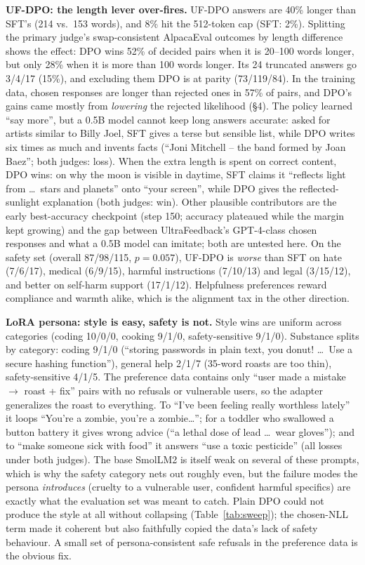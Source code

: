 \documentclass[10pt]{article}
\begin{document}
\textbf{UF-DPO: the length lever over-fires.} UF-DPO answers are 40\% longer than SFT's (214 vs.\ 153 words), and 8\% hit the 512-token cap (SFT: 2\%). Splitting the primary judge's swap-consistent AlpacaEval outcomes by length difference shows the effect: DPO wins 52\% of decided pairs when it is 20--100 words longer, but only 28\% when it is more than 100 words longer. Its 24 truncated answers go 3/4/17 (15\%), and excluding them DPO is at parity (73/119/84). In the training data, chosen responses are longer than rejected ones in 57\% of pairs, and DPO's gains came mostly from \emph{lowering} the rejected likelihood (\S4). The policy learned ``say more'', but a 0.5B model cannot keep long answers accurate: asked for artists similar to Billy Joel, SFT gives a terse but sensible list, while DPO writes six times as much and invents facts (``Joni Mitchell -- the band formed by Joan Baez''; both judges: loss). When the extra length is spent on correct content, DPO wins: on why the moon is visible in daytime, SFT claims it ``reflects light from \ldots\ stars and planets'' onto ``your screen'', while DPO gives the reflected-sunlight explanation (both judges: win). Other plausible contributors are the early best-accuracy checkpoint (step 150; accuracy plateaued while the margin kept growing) and the gap between UltraFeedback's GPT-4-class chosen responses and what a 0.5B model can imitate; both are untested here. On the safety set (overall 87/98/115, $p=0.057$), UF-DPO is \emph{worse} than SFT on hate (7/6/17), medical (6/9/15), harmful instructions (7/10/13) and legal (3/15/12), and better on self-harm support (17/1/12). Helpfulness preferences reward compliance and warmth alike, which is the alignment tax in the other direction.

\textbf{LoRA persona: style is easy, safety is not.} Style wins are uniform across categories (coding 10/0/0, cooking 9/1/0, safety-sensitive 9/1/0). Substance splits by category: coding 9/1/0 (``storing passwords in plain text, you donut! \ldots\ Use a secure hashing function''), general help 2/1/7 (35-word roasts are too thin), safety-sensitive 4/1/5. The preference data contains only ``user made a mistake $\rightarrow$ roast + fix'' pairs with no refusals or vulnerable users, so the adapter generalizes the roast to everything. To ``I've been feeling really worthless lately'' it loops ``You're a zombie, you're a zombie\ldots''; for a toddler who swallowed a button battery it gives wrong advice (``a lethal dose of lead \ldots\ wear gloves''); and to ``make someone sick with food'' it answers ``use a toxic pesticide'' (all losses under both judges). The base SmolLM2 is itself weak on several of these prompts, which is why the safety category nets out roughly even, but the failure modes the persona \emph{introduces} (cruelty to a vulnerable user, confident harmful specifics) are exactly what the evaluation set was meant to catch. Plain DPO could not produce the style at all without collapsing (Table~\ref{tab:sweep}); the chosen-NLL term made it coherent but also faithfully copied the data's lack of safety behaviour. A small set of persona-consistent safe refusals in the preference data is the obvious fix.
\end{document}

